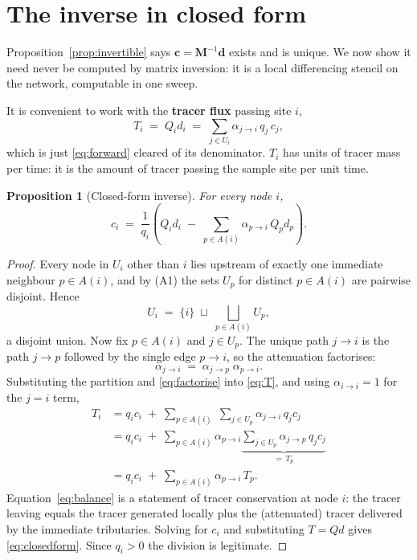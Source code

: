 \documentclass[11pt]{article}
\newcommand{\cvec}{\ensuremath{\mathbf{c}}\xspace}
\newcommand{\dvec}{\ensuremath{\mathbf{d}}\xspace}
\newcommand{\Mmat}{\ensuremath{\mathbf{M}}\xspace}
\newtheorem{theorem}{Proposition}
\theoremstyle{definition}
\begin{document}
\section{The inverse in closed form}
\label{sec:inverse}

Proposition~\ref{prop:invertible} says $\cvec = \Mmat^{-1}\dvec$ exists and is unique. We now show
it need never be computed by matrix inversion: it is a local differencing stencil on the
network, computable in one sweep.

It is convenient to work with the \textbf{tracer flux} passing site $i$,
\begin{equation}
  T_i \;=\; Q_i d_i \;=\; \sum_{j \in U_i} \alpha_{j \to i}\, q_j\, c_j ,
  \label{eq:T}
\end{equation}
which is just \eqref{eq:forward} cleared of its denominator. $T_i$ has units of tracer mass per
time: it is the amount of tracer passing the sample site per unit time.

\begin{theorem}[Closed-form inverse]\label{prop:inverse}
For every node $i$,
\begin{equation}
  \boxed{\;
  c_i \;=\; \frac{1}{q_i}\left( Q_i d_i \;-\; \sum_{p \in A(i)} \alpha_{p \to i}\, Q_p d_p \right) .
  \;}
  \label{eq:closedform}
\end{equation}
\end{theorem}

\begin{proof}
Every node in $U_i$ other than $i$ lies upstream of exactly one immediate neighbour $p \in
A(i)$, and by (A1) the sets $U_p$ for distinct $p \in A(i)$ are pairwise disjoint. Hence
\[
  U_i \;=\; \{i\} \;\sqcup\; \bigsqcup_{p \in A(i)} U_p ,
\]
a disjoint union. Now fix $p \in A(i)$ and $j \in U_p$. The unique path $j \to i$ is the path
$j \to p$ followed by the single edge $p \to i$, so the attenuation factorises:
\begin{equation}
  \alpha_{j \to i} \;=\; \alpha_{j \to p}\;\alpha_{p \to i} .
  \label{eq:factorise}
\end{equation}
Substituting the partition and \eqref{eq:factorise} into \eqref{eq:T}, and using
$\alpha_{i \to i} = 1$ for the $j = i$ term,
\begin{align}
  T_i
  &= q_i c_i \;+\; \sum_{p \in A(i)} \; \sum_{j \in U_p} \alpha_{j \to i}\, q_j c_j \nonumber\\
  &= q_i c_i \;+\; \sum_{p \in A(i)} \alpha_{p \to i} \underbrace{\sum_{j \in U_p} \alpha_{j \to p}\, q_j c_j}_{= \,T_p} \nonumber\\
  &= q_i c_i \;+\; \sum_{p \in A(i)} \alpha_{p \to i}\, T_p .
  \label{eq:balance}
\end{align}
Equation~\eqref{eq:balance} is a statement of tracer conservation at node $i$: the tracer
leaving equals the tracer generated locally plus the (attenuated) tracer delivered by the
immediate tributaries. Solving for $c_i$ and substituting $T = Qd$ gives
\eqref{eq:closedform}. Since $q_i > 0$ the division is legitimate.
\end{proof}
\end{document}
